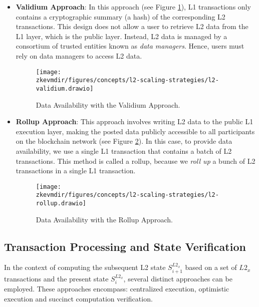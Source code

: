 \begin{itemize}

\item \textbf{Validium Approach}: In this approach (see Figure \ref{fig:validium}), L1 transactions only contains a cryptographic summary (a hash) of the corresponding L2 transactions. This design does not allow a user to retrieve L2 data from the L1 layer, which is the public layer. Instead, L2 data is managed by a consortium of trusted entities known as \textit{data managers}. Hence, users must rely on data managers to access L2 data.

\begin{figure}[H]
\centering
\texttt{[image: \\zkevmdir/figures/concepts/l2-scaling-strategies/l2-validium.drawio]}
\caption{Data Availability with the Validium Approach.}
\label{fig:validium}
\end{figure}



\item \textbf{Rollup Approach}: This approach involves writing L2 data to the public L1 execution layer, making the posted data publicly accessible to all participants on the blockchain network (see Figure \ref{fig:rollup}). In this case, to provide data availability, we use a single L1 transaction that contains a batch of L2 transactions. This method is called a rollup, because we \textit{roll up} a bunch of L2 transactions in a single L1 transaction.

\begin{figure}[H]
\centering
\texttt{[image: \\zkevmdir/figures/concepts/l2-scaling-strategies/l2-rollup.drawio]}
\caption{Data Availability with the Rollup Approach.}
\label{fig:rollup}
\end{figure}

\end{itemize}


\subsection{Transaction Processing and State Verification}

In the context of computing the subsequent L2 state $S^{L2_x}_{i+1}$ based on a set of $L2_x$ transactions and the present state $S^{L2_x}_i$, several distinct approaches can be employed. These approaches encompass:
centralized execution, optimistic execution and succinct computation verification.


